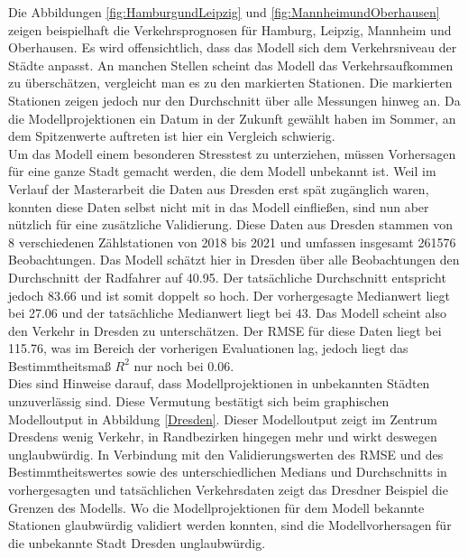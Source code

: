 \documentclass[a4paper,12pt]{thesis}
\begin{document}
Die Abbildungen \ref{fig:HamburgundLeipzig} und \ref{fig:MannheimundOberhausen} zeigen beispielhaft die Verkehrsprognosen für Hamburg, Leipzig, Mannheim und Oberhausen. Es wird offensichtlich, dass das Modell sich dem Verkehrsniveau der Städte anpasst. An manchen Stellen scheint das Modell das Verkehrsaufkommen zu überschätzen, vergleicht man es zu den markierten Stationen. Die markierten Stationen zeigen jedoch nur den Durchschnitt über alle Messungen hinweg an. Da die Modellprojektionen ein Datum in der Zukunft gewählt haben im Sommer, an dem Spitzenwerte auftreten ist hier ein Vergleich schwierig.\\
Um das Modell einem besonderen Stresstest zu unterziehen, müssen Vorhersagen für eine ganze Stadt gemacht werden, die dem Modell unbekannt ist. Weil im Verlauf der Masterarbeit die Daten aus Dresden erst spät zugänglich waren, konnten diese Daten selbst nicht mit in das Modell einfließen, sind nun aber nützlich für eine zusätzliche Validierung. Diese Daten aus Dresden stammen von 8 verschiedenen Zählstationen von 2018 bis 2021 und umfassen insgesamt 261576 Beobachtungen. Das Modell schätzt hier in Dresden über alle Beobachtungen den Durchschnitt der Radfahrer auf 40.95. Der tatsächliche Durchschnitt entspricht jedoch 83.66 und ist somit doppelt so hoch. Der vorhergesagte Medianwert liegt bei 27.06 und der tatsächliche Medianwert liegt bei 43. Das Modell scheint also den Verkehr in Dresden zu unterschätzen. Der RMSE für diese Daten liegt bei 115.76, was im Bereich der vorherigen Evaluationen lag, jedoch liegt das Bestimmtheitsmaß $R^2$ nur noch bei 0.06.\\
Dies sind Hinweise darauf, dass Modellprojektionen in unbekannten Städten unzuverlässig sind. Diese Vermutung bestätigt sich beim graphischen Modelloutput in Abbildung \ref{Dresden}. Dieser Modelloutput zeigt im Zentrum Dresdens wenig Verkehr, in Randbezirken hingegen mehr und wirkt deswegen unglaubwürdig. In Verbindung mit den Validierungswerten des RMSE und des Bestimmtheitswertes sowie des unterschiedlichen Medians und Durchschnitts in vorhergesagten und tatsächlichen Verkehrsdaten zeigt das Dresdner Beispiel die Grenzen des Modells. Wo die Modellprojektionen für dem Modell bekannte Stationen glaubwürdig validiert werden konnten, sind die Modellvorhersagen für die unbekannte Stadt Dresden unglaubwürdig.
\end{document}
